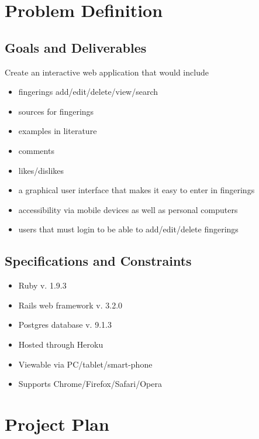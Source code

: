 \documentclass[12pt,english]{article}
\begin{document}
\section{Problem Definition}


\subsection{Goals and Deliverables}

Create an interactive web application that would include 
\begin{itemize}
\item fingerings add/edit/delete/view/search 
\item sources for fingerings 
\item examples in literature 
\item comments 
\item likes/dislikes 
\item a graphical user interface that makes it easy to enter in fingerings 
\item accessibility via mobile devices as well as personal computers 
\item users that must login to be able to add/edit/delete fingerings 
\end{itemize}

\subsection{Specifications and Constraints}
\begin{itemize}
\item Ruby v. 1.9.3 
\item Rails web framework v. 3.2.0 
\item Postgres database v. 9.1.3 
\item Hosted through Heroku 
\item Viewable via PC/tablet/smart-phone 
\item Supports Chrome/Firefox/Safari/Opera 
\end{itemize}

\section{Project Plan}
\end{document}

